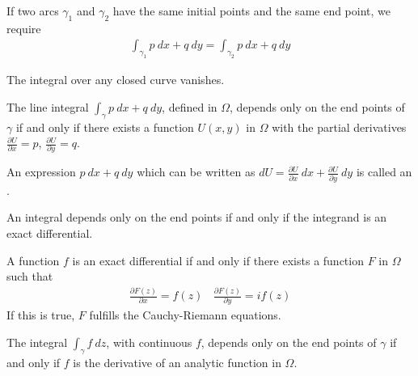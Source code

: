 \begin{theorem}
    If two arcs $\gamma_1$ and $\gamma_2$ have the same initial points and the same
    end point, we require
    \begin{align*}
        \int_{\gamma_1} p \ dx + q \ dy = \int_{\gamma_2} p \ dx + q \ dy
    \end{align*}
\end{theorem}

\begin{theorem}
    The integral over any closed curve vanishes.
\end{theorem}

\begin{theorem}
    The line integral $\int_\gamma p \ dx + q \ dy$, defined in $\Omega$, depends
    only on the end points of $\gamma$ if and only if there exists a function
    $U(x,y)$ in $\Omega$ with the partial derivatives $\frac{\partial U}{\partial x} = p$,
    $\frac{\partial U}{\partial y} = q$.
\end{theorem}

\begin{definition}
    An expression $p \ dx + q \ dy$ which can be written as
    $d U = \frac{\partial U}{\partial x} \ dx + \frac{\partial U}{\partial y} \ dy$
    is called an .
\end{definition}

\begin{theorem}
    An integral depends only on the end points if and only if the integrand is an exact
    differential.
\end{theorem}

\begin{theorem}
    A function $f$ is an exact differential if and only if there exists a function
    $F$ in $\Omega$ such that
    \begin{align*}
        \frac{\partial F(z)}{\partial x} = f(z)
        \ \ \ \
        \frac{\partial F(z)}{\partial y} = i f(z)
    \end{align*}
    If this is true, $F$ fulfills the Cauchy-Riemann equations.
\end{theorem}

\begin{theorem}
    The integral $\int_\gamma f \ dz$, with continuous $f$, depends only on the
    end points of $\gamma$ if and only if $f$ is the derivative of an analytic
    function in $\Omega$.
\end{theorem}

